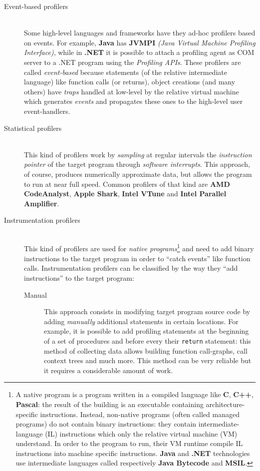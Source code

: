 \documentclass[a4paper,10pt]{report}
\begin{document}
\begin{description}
\item[Event-based profilers] \hfill \\
Some high-level languages and frameworks have they ad-hoc profilers based on
events. For example, \textbf{Java} has \textbf{JVMPI} \textit{(Java Virtual
Machine Profiling Interface)}, while in \textbf{.NET} it is possible to attach a
profiling agent as COM server to a .NET program using the \emph{Profiling APIs}.
These profilers are called \emph{event-based} because statements (of the
relative intermediate language) like function calls (or returns), object
creations (and many others) have \emph{traps} handled at low-level by the
relative virtual machine which generates \emph{events} and propagates these ones
to the high-level user event-handlers.

\item[Statistical profilers] \hfill \\
This kind of profilers work by \emph{sampling} at regular intervals the
\emph{instruction pointer} of the target program through \emph{software interrupts}.
This approach, of course, produces numerically approximate data, but allows the
program to run at near full speed. Common profilers of that kind are \textbf{AMD
CodeAnalyst}, \textbf{Apple Shark}, \textbf{Intel VTune} and \textbf{Intel
Parallel Amplifier}.

\item[Instrumentation profilers] \hfill \\
This kind of profilers are used for \emph{native programs}\footnote{A native
program is a program written in a compiled language like \textbf{C},
\textbf{C++}, \textbf{Pascal}: the result of the building is an executable
containing architecture-specific instructions. Instead, non-native programs (often called
managed programs) do not contain binary instructions: they contain
intermediate-language (IL) instructions which only the relative virtual machine
(VM) understand. In order to the program to run, their VM runtime compile IL
instructions into machine specific instructions. \textbf{Java} and \textbf{.NET}
technologies use intermediate languages called respectively \textbf{Java Bytecode} and
\textbf{MSIL}.} and need to add binary instructions to the target program in
order to ``catch events'' like function calls. Instrumentation profilers can be
classified by the way they ``add instructions'' to the target program:

\begin{description}
\item[Manual]
This approach consists in modifying target program source code by adding \emph{manually}
additional statements in certain locations. For example, it is possible to add profiling
statements at the beginning of a set of procedures and before every their
\verb|return| statement: this method of collecting data allows building function
call-graphs, call context trees and much more. This method can be very
reliable but it requires a considerable amount of work.


\end{description}
\end{description}
\end{document}
